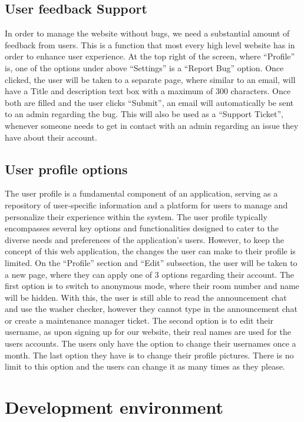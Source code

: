 \documentclass[conference]{IEEEtran}
\begin{document}
\subsection{User feedback Support}
In order to manage the website without bugs, we need a substantial amount of feedback from users. This is a function that most every high level website has in order to enhance user experience. At the top right of the screen, where “Profile” is, one of the options under above “Settings” is a “Report Bug” option. Once clicked, the user will be taken to a separate page, where similar to an email, will have a Title and description text box with a maximum of 300 characters. Once both are filled and the user clicks “Submit”, an email will automatically be sent to an admin regarding the bug. This will also be used as a “Support Ticket”, whenever someone needs to get in contact with an admin regarding an issue they have about their account.
\subsection{User profile options}
The user profile is a fundamental component of an application, serving as a repository of user-specific information and a platform for users to manage and personalize their experience within the system. The user profile typically encompasses several key options and functionalities designed to cater to the diverse needs and preferences of the application's users. However, to keep the concept of this web application, the changes the user can make to their profile is limited. On the “Profile” section and “Edit” subsection, the user will be taken to a new page, where they can apply one of 3 options regarding their account. The first option is to switch to anonymous mode, where their room number and name will be hidden. With this, the user is still able to read the announcement chat and use the washer checker, however they cannot type in the announcement chat or create a maintenance manager ticket. The second option is to edit their username, as upon signing up for our website, their real names are used for the users accounts. The users only have the option to change their usernames once a month. The last option they have is to change their profile pictures. There is no limit to this option and the users can change it as many times as they please.



\section{Development environment}
\end{document}
